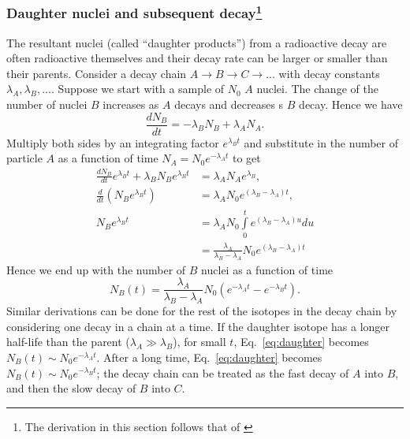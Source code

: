 \documentclass[nofootinbib,preprint,aps]{revtex4-1}
\begin{document}
        \subsubsection{Daughter nuclei and subsequent decay\footnote{The derivation in this section follows that of
        \cite[chapt. 1.5]{l01}}}
        The resultant nuclei (called ``daughter products'') from a radioactive decay are often radioactive
        themselves and their decay rate can be larger or smaller than their parents. Consider a decay chain
        $A\rightarrow B \rightarrow C \rightarrow ...$ with decay constants $\lambda_A, \lambda_B,...$. Suppose
        we start with a sample of $N_0$ $A$ nuclei. The change of the number of nuclei $B$ increases as $A$
        decays and decreases s $B$ decay. Hence we have
        \begin{equation}
            \frac{dN_B}{dt} = -\lambda_B N_B + \lambda_A N_A.
        \end{equation}
        Multiply both sides by an integrating factor $e^{\lambda_B t}$ and substitute in the number of particle
        $A$ as a function of time $N_A=N_0 e^{-\lambda_A t}$ to get
        \begin{align}
            \frac{dN_B}{dt}e^{\lambda_B t} + \lambda_B N_B e^{\lambda_B t} &= \lambda_A N_A e^{\lambda_B},\nonumber\\
            \frac{d}{dt} (N_B e^{\lambda_B t}) &= \lambda_A N_0 e^{(\lambda_B-\lambda_A)t}, \nonumber\\
            N_B e^{\lambda_B t} &= \lambda_A N_0 \int\limits_0^t e^{(\lambda_B - \lambda_A)u} du \nonumber\\
                                &= \frac{\lambda_A}{\lambda_B-\lambda_A}N_0 e^{(\lambda_B - \lambda_A)t}
        \end{align}
        Hence we end up with the number of $B$ nuclei as a function of time
        \begin{equation}
            N_B(t)=\frac{\lambda_A}{\lambda_B-\lambda_A}N_0(e^{-\lambda_A t} - e^{-\lambda_B t}).
            \label{eq:daughter}
        \end{equation}
        Similar derivations can be done for the rest of the isotopes in the decay chain by considering
        one decay in a chain at a time. If the daughter isotope has a longer half-life than the parent
        ($\lambda_A \gg \lambda_B$), for small $t$, Eq.~\ref{eq:daughter} becomes
        $N_B(t)\sim N_0 e^{-\lambda_A t}$. After a long time,
        Eq.~\ref{eq:daughter} becomes $N_B(t) \sim N_0 e^{-\lambda_B t}$; the decay
        chain can be treated as the fast decay of $A$ into $B$, and then the slow decay of $B$
        into $C$.
        
\end{document}
